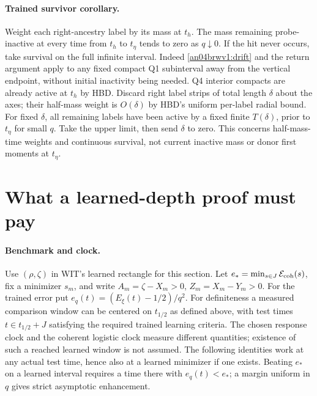 \documentclass[11pt]{article}
\begin{document}
\paragraph{Trained survivor corollary.}\label{an04brwv1:survivors}
Weight each right-ancestry label by its mass at $t_h$.
The mass remaining probe-inactive at every time from $t_h$ to
$t_\eta$ tends to zero as $q\downarrow0$. If the hit never occurs,
take survival on the full infinite interval.
Indeed \eqref{an04brwv1:drift} and the return argument apply to
any fixed compact Q1 subinterval away from the vertical endpoint,
without initial inactivity being needed. Q4 interior compacts are
already active at $t_h$ by HBD. Discard right label strips of total
length $\delta$ about the axes; their half-mass weight is $O(\delta)$
by HBD's uniform per-label radial bound. For fixed $\delta$, all
remaining labels have been active by a fixed finite $T(\delta)$,
prior to $t_\eta$ for small $q$. Take the upper limit, then send
$\delta$ to zero. This concerns half-mass-time weights and continuous
survival, not current inactive mass or donor first moments at
$t_\eta$.

\section{What a learned-depth proof must pay}
\paragraph{Benchmark and clock.}
Use $(\rho,\zeta)$ in WIT's learned rectangle for this section.
Let $e_*=\min_{s\in J}\mathcal E_{\rm coh}(s)$, fix a minimizer
$s_m$, and write $A_m=\zeta-X_m>0$, $Z_m=X_m-Y_m>0$.
For the trained error put $e_q(t)=(E_\xi(t)-1/2)/q^2$.
For definiteness a measured comparison window can be centered on
$t_{1/2}$ as defined above, with test times $t\in t_{1/2}+J$
satisfying the required trained learning criteria. The chosen
response clock and the coherent logistic clock measure different
quantities; existence of such a reached learned window is not assumed.
The following identities work at any actual test time, hence also
at a learned minimizer if one exists. Beating $e_*$ on a learned
interval requires a time there with $e_q(t)<e_*$; a margin uniform
in $q$ gives strict asymptotic enhancement.
\end{document}
